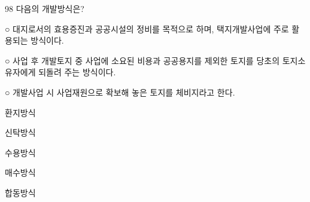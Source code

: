 \begin{question}{98}
다음의 개발방식은?
\begin{framedtext}
○ 대지로서의 효용증진과 공공시설의 정비를 목적으로 하며, 택지개발사업에 주로 활용되는 방식이다. \par
○ 사업 후 개발토지 중 사업에 소요된 비용과 공공용지를 제외한 토지를 당초의 토지소유자에게 되돌려 주는 방식이다. \par
○ 개발사업 시 사업재원으로 확보해 놓은 토지를 체비지라고 한다. \par
\end{framedtext}
\begin{choices}
  \item 환지방식
  \item 신탁방식
  \item 수용방식
  \item 매수방식
  \item 합동방식
\end{choices}
\end{question}
